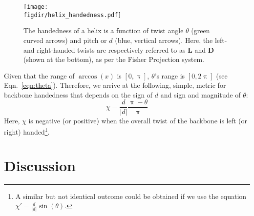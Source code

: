 \documentclass[fleqn,10pt]{wlpeerj} %
\newcommand{\Eqn}[1]{Eqn.~\ref{#1}}
\newcommand{\figdir}{./figures}
\begin{document}
\begin{figure}[t!]
\centering
\texttt{[image: \\figdir/helix\_handedness.pdf]}
\caption{\label{fig:helix_handedness} The handedness of a helix is a function of twist angle $\theta$ (green curved arrows) and pitch or $d$ (blue, vertical arrows). Here, the left- and right-handed twists are respectively referred to as $\textbf{L}$ and $\textbf{D}$ (shown at the bottom), as per the Fisher Projection system.}
\end{figure}

Given that the range of $\arccos(x)$ is $[0,\uppi]$, $\theta$'s range is $[0,2\uppi]$ (see \Eqn{eqn:theta}). Therefore, we arrive at the following, simple, metric for backbone handedness that depends on the sign of $d$ and sign and magnitude of $\theta$:
\begin{equation}\label{eqn:chi}
\chi = \frac{d}{|d|}\frac{\uppi-\theta}{\uppi}
\end{equation}
Here, $\chi$ is negative (or positive) when the overall twist of the backbone is left (or right) handed\footnote{A similar but not identical outcome could be obtained if we use the equation $\chi' = \frac{d}{|d|}\sin(\theta)$.}.

\section*{Discussion}
\end{document}
